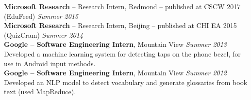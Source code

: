 \documentclass[margin,line]{resume}
\begin{document}
\begin{resume}
\textbf{Microsoft Research} -- Research Intern, Redmond -- published at CSCW 2017 (EduFeed) \hfill \textsl{Summer 2015}\\
\textbf{Microsoft Research} -- Research Intern, Beijing -- published at CHI EA 2015 (QuizCram) \hfill \textsl{Summer 2014}\\
\textbf{Google -- Software Engineering Intern}, Mountain View \hfill \textsl{Summer 2013}\\
Developed a machine learning system for detecting taps on the phone bezel, for use in Android input methods.\\
\textbf{Google -- Software Engineering Intern}, Mountain View  \hfill \textsl{Summer 2012}\\
Developed an NLP model to detect vocabulary and generate glossaries from book text (used MapReduce).\\ %

\end{resume}
\end{document}
